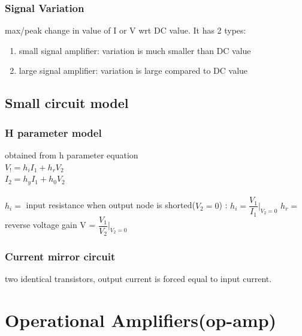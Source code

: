 \documentclass[10pt, a4paper]{report}
\begin{document}
	\subsection{Signal Variation}
	max/peak change in value of I or V wrt DC value. It has 2 types:
	\begin{enumerate}
		\item small signal amplifier: variation is much smaller than DC value
		\item large signal amplifier: variation is large compared to DC value
	\end{enumerate}

	\section{Small circuit model}
	\subsection{H parameter model}
	obtained from h parameter equation\\
	$ V_! = h_i I_1 + h_r V_2 $ \\
	$ I_2 = h_y I_1 + h_0 V_2 $ \\\\
	
	$ h_i =  $ input resistance when output node is shorted($ V_2 = 0 $) : $ h_i = \dfrac{V_1}{I_1}|_{V_2=0} $
	$ h_r =  $ reverse voltage gain V = $ \dfrac{V_1}{V_2}|_{V_2 = 0} $
	
	\subsection{Current mirror circuit}
	two identical transistors, output current is forced equal to input current.\\
	
	
	\chapter{Operational Amplifiers(op-amp)}
	
\end{document}
